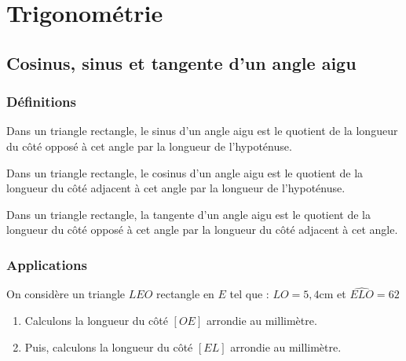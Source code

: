 \documentclass[a4paper,10pt]{report}
\begin{document}
\newpage
\setcounter{chapter}{4}
\chapter{Trigonométrie}

\section{Cosinus, sinus et tangente d'un angle aigu}

\subsection{Définitions}

\begin{defn}
Dans un triangle rectangle, le sinus d'un angle aigu est le quotient de la longueur du côté opposé à cet angle par la longueur de l'hypoténuse.
\end{defn}

\begin{defn}
Dans un triangle rectangle, le cosinus d'un angle aigu est le quotient de la longueur du côté adjacent à cet angle par la longueur de l'hypoténuse.
\end{defn}

\begin{defn}
Dans un triangle rectangle, la tangente d'un angle aigu est le quotient de la longueur du côté opposé à cet angle par la longueur du côté adjacent à cet angle.
\end{defn}

\subsection{Applications}

\begin{meth}

On considère un triangle $LEO$ rectangle en $E$ tel que :
$LO=5,4$cm et $\widehat{ELO}=62$\degre

\begin{enumerate}
\item Calculons la longueur du côté $[OE]$ arrondie au millimètre.

\noindent\grandscarreaux{\linewidth}{4.8cm}
\item Puis, calculons la longueur du côté $[EL]$ arrondie au millimètre.

\noindent\grandscarreaux{\linewidth}{4.8cm}
\end{enumerate}
\end{meth}
\end{document}
